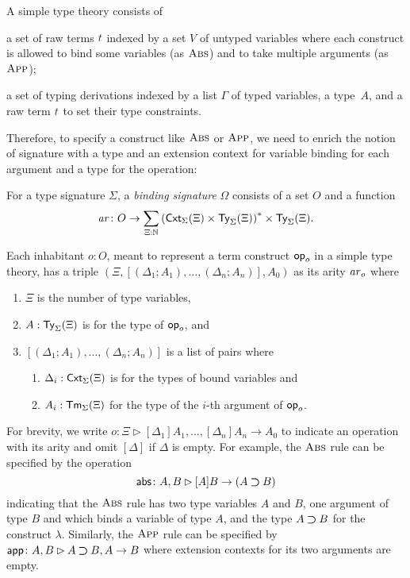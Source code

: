 A simple type theory consists of
\begin{enumerate*}
  \item a set of raw terms $\isTerm{t}$ indexed by a set $V$ of untyped variables where each construct is allowed to bind some variables (as $\textnormal{\textsc{Abs}}$) and to take multiple arguments (as $\textnormal{\textsc{App}}$);
  \item a set of typing derivations indexed by a list $\Gamma$ of typed variables, a type~$A$, and a raw term $\isTerm{t}$ to set their type constraints. 
\end{enumerate*}
Therefore, to specify a construct like $\textnormal{\textsc{Abs}}$ or $\textnormal{\textsc{App}}$, we need to enrich the notion of signature with a type and an extension context for variable binding for each argument and a type for the operation:
\begin{definition}\label{def:binding-signature}
  For a type signature $\Sigma$, a \emph{binding signature} $\Omega$ consists of a set $O$ and a function
  \[
    \mathit{ar}\colon O \to \sum_{\Xi : \mathbb{N}} \left(\mathsf{Cxt}_\Sigma(\Xi) \times \mathsf{Ty}_\Sigma(\Xi)\right)^* \times \mathsf{Ty}_\Sigma(\Xi).
  \]
\end{definition}
Each inhabitant $o: O$, meant to represent a term construct $\mathsf{op}_o$ in a simple type theory, has a triple $\left(\Xi, \left[\left(\Delta_1; A_1\right), \ldots, \left(\Delta_{n}; A_{n}\right) \right], A_0\right)$ as its arity $\mathit{ar}_o$ where
\begin{enumerate}
  \item $\Xi$ is the number of type variables, 
  \item $A : \mathsf{Ty}_\Sigma(\Xi)$ is for the type of $\mathsf{op}_o$, and
  \item $\left[\left(\Delta_1; A_{1}\right), \ldots, \left(\Delta_{n}; A_{n}\right) \right]$ is a list of pairs where
    \begin{enumerate}
      \item $\Delta_i : \mathsf{Cxt}_{\Sigma}(\Xi)$ is for the types of bound variables and
      \item $A_i : \mathsf{Tm}_{\Sigma}(\Xi)$ for the type of the $i$-th argument of $\mathsf{op}_{o}$.
    \end{enumerate}
\end{enumerate}
For brevity, we write $o \colon \Xi \rhd [\Delta_1]A_{1}, \ldots, \left[\Delta_{n}\right] A_{n} \to A_0$ to indicate an operation with its arity and omit $[\Delta]$ if $\Delta$ is empty. 
For example, the $\textnormal{\textsc{Abs}}$ rule can be specified by the operation 
\[
  \mathsf{abs}\colon A , B \rhd [A]B \to (A \mathbin{\bm{\supset}} B)
\]
indicating that the $\textnormal{\textsc{Abs}}$ rule has two type variables $A$ and $B$, one argument of type $B$ and which binds a variable of type $A$, and the type $A \mathbin{\bm{\supset}} B$ for the construct $\lambda$.
Similarly, the $\textnormal{\textsc{App}}$ rule can be specified by $\mathsf{app}\colon A, B \rhd A \mathbin{\bm{\supset}} B, A \to B$ where extension contexts for its two arguments are empty.

